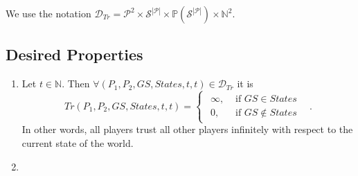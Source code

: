     We use the notation $\mathcal{D}_{Tr} = \mathcal{P}^2 \times \mathcal{S}^{|\mathcal{P}|} \times
    \mathbb{P}\left(\mathcal{S}^{|\mathcal{P}|}\right) \times \mathbb{N}^2$.

  \subsection{Desired Properties}
    \begin{enumerate}
      \item Let $t \in \mathbb{N}$. Then $\forall \left(P_1, P_2, GS, States, t, t\right) \in \mathcal{D}_{Tr}$ it is
      \begin{equation*}
        Tr\left(P_1, P_2, GS, States, t, t\right) =
	\begin{cases}
	\begin{aligned}
	  \infty, & \mbox{ if } GS \in States \\
          0, & \mbox{ if } GS \notin States
	\end{aligned}
	\end{cases} \enspace.
      \end{equation*}
      In other words, all players trust all other players infinitely with respect to the current state of the world.
      \item 

    \end{enumerate}
